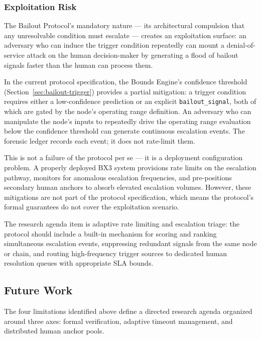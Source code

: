 \subsubsection{Exploitation Risk}
\label{sec:limitations-exploitation}

The Bailout Protocol's mandatory nature — its architectural compulsion that any unresolvable condition must escalate — creates an exploitation surface: an adversary who can induce the trigger condition repeatedly can mount a denial-of-service attack on the human decision-maker by generating a flood of bailout signals faster than the human can process them.

In the current protocol specification, the Bounds Engine's confidence threshold (Section~\ref{sec:bailout-trigger}) provides a partial mitigation: a trigger condition requires either a low-confidence prediction or an explicit \texttt{bailout\_signal}, both of which are gated by the node's operating range definition. An adversary who can manipulate the node's inputs to repeatedly drive the operating range evaluation below the confidence threshold can generate continuous escalation events. The forensic ledger records each event; it does not rate-limit them.

This is not a failure of the protocol per se — it is a deployment configuration problem. A properly deployed BX3 system provisions rate limits on the escalation pathway, monitors for anomalous escalation frequencies, and pre-positions secondary human anchors to absorb elevated escalation volumes. However, these mitigations are not part of the protocol specification, which means the protocol's formal guarantees do not cover the exploitation scenario.

The research agenda item is adaptive rate limiting and escalation triage: the protocol should include a built-in mechanism for scoring and ranking simultaneous escalation events, suppressing redundant signals from the same node or chain, and routing high-frequency trigger sources to dedicated human resolution queues with appropriate SLA bounds.

\subsection{Future Work}
\label{sec:limitations-future}

The four limitations identified above define a directed research agenda organized around three axes: formal verification, adaptive timeout management, and distributed human anchor pools.

